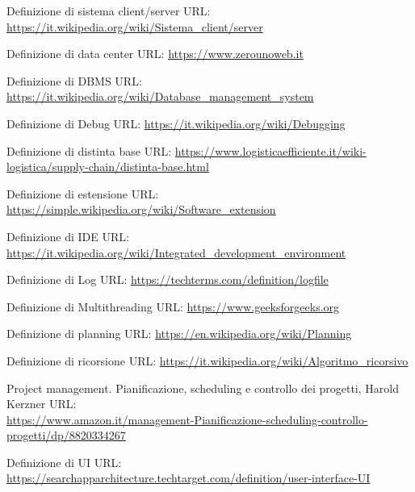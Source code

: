 \begin{enumerate}[label={[\arabic*]}]
    \item \label{client/server} Definizione di sistema client/server URL: \url{https://it.wikipedia.org/wiki/Sistema_client/server}

    \item \label{datacenter} Definizione di data center URL: \url{https://www.zerounoweb.it}
    
    \item \label{dbms} Definizione di DBMS URL: \url{https://it.wikipedia.org/wiki/Database_management_system}
    
    \item \label{debug} Definizione di Debug URL: \url{https://it.wikipedia.org/wiki/Debugging}
    
    \item \label{distinta-base} Definizione di distinta base URL: \url{https://www.logisticaefficiente.it/wiki-logistica/supply-chain/distinta-base.html}
    
    \item \label{estensione} Definizione di estensione URL: \url{https://simple.wikipedia.org/wiki/Software_extension}

    \item \label{ide} Definizione di IDE URL: \url{https://it.wikipedia.org/wiki/Integrated_development_environment}
    
    \item \label{log} Definizione di Log URL: \url{https://techterms.com/definition/logfile}

    \item \label{multithread} Definizione di Multithreading URL: \url{https://www.geeksforgeeks.org}
    
    \item \label{planning} Definizione di planning URL: \url{https://en.wikipedia.org/wiki/Planning}
    
    \item \label{ricorsione} Definizione di ricorsione URL: \url{https://it.wikipedia.org/wiki/Algoritmo_ricorsivo}
    
    \item \label{scheduling2} Project management. Pianificazione, scheduling e controllo dei progetti, Harold Kerzner URL:\\ \url{https://www.amazon.it/management-Pianificazione-scheduling-controllo-progetti/dp/8820334267}
    
    \item \label{UI} Definizione di UI URL: \url{https://searchapparchitecture.techtarget.com/definition/user-interface-UI}
\end{enumerate}